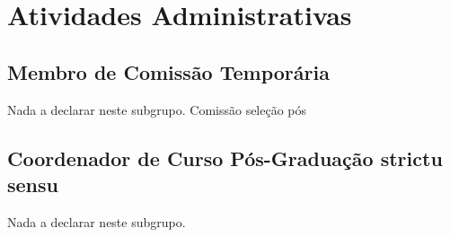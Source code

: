 \documentclass[a4paper,oneside,10pt]{article}
\begin{document}
\newpage
\section{Atividades Administrativas}
\vspace{0.3cm}


\subsection{Membro de Comiss\~{a}o Tempor\'{a}ria}
\vspace{0.3cm}

Nada a declarar neste subgrupo.
%
%
%
Comissão seleção pós


\subsection{Coordenador de Curso Pós-Graduação \textbf{strictu sensu} }
\vspace{0.3cm}

Nada a declarar neste subgrupo.
%
%
%

\end{document}
